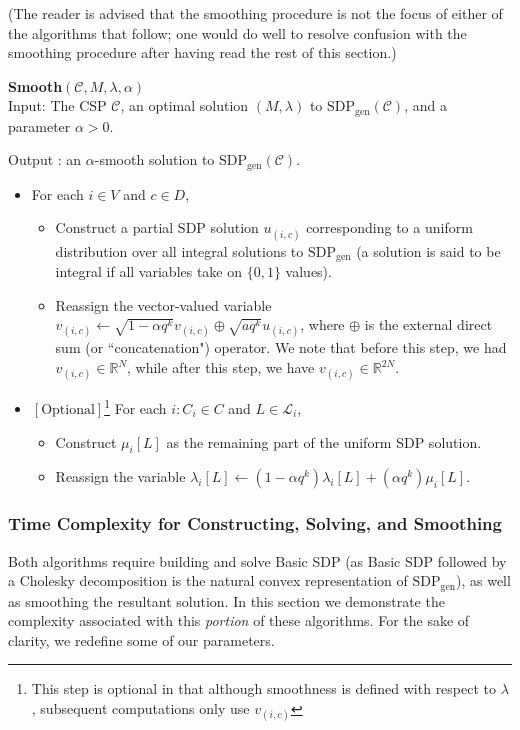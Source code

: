 \documentclass[letterpaper, 12pt]{article}
\numberwithin{equation}{section}
\begin{document}
 (The reader is advised that the smoothing procedure is not the focus of either of the algorithms that follow; one would do well to resolve confusion with the smoothing procedure after having read the rest of this section.)

\begin{algorithm}\textbf{Smooth$(\mathcal{C},M,\lambda, \alpha)$} \\

Input: The CSP $\mathcal{C}$, an optimal solution $(M,\lambda)$ to $\text{SDP}_{\text{gen}}(\mathcal{C})$, and a parameter $\alpha > 0$. 

Output : an $\alpha$-smooth solution to $\text{SDP}_{\text{gen}}(\mathcal{C})$.
\begin{itemize}
\item For each $i \in V$ and $c \in D$,
	\begin{itemize}
	\item Construct a partial SDP solution $u_{(i,c)}$ corresponding to a uniform distribution over all integral
	 solutions to
	$\text{SDP}_{\text{gen}}$ (a solution is said to be integral if all variables take on $\{0,1\}$ values).
	\item Reassign the vector-valued variable $v_{(i,c)} \leftarrow \sqrt{1-\alpha q^k} v_{(i,c)} \oplus \sqrt{aq^k}
	u_{(i,c)}$, where $\oplus$ is the external direct sum (or ``concatenation") operator. We note that before this step, we had	
	$v_{(i,c)} \in \mathbb{R}^N$, while after this step, we have $v_{(i,c)} \in \mathbb{R}^{2N}$.
	\end{itemize}
\item $\left[\text{Optional}\right]$\footnote{This step is optional in that although smoothness is defined with respect to $\lambda$, subsequent computations only use $v_{(i,c)}$} For each $i : C_i \in C$ and $L \in \mathcal{L}_i$,
	\begin{itemize}
	\item  Construct $\mu_i[L]$ as the remaining part of the uniform SDP solution.
	\item Reassign the variable $\lambda_i[L] \leftarrow (1-\alpha q^k)\lambda_{i}[L] + (\alpha q^k)\mu_i[L]$. 
	\end{itemize}
\end{itemize}
\end{algorithm}

\subsubsection{Time Complexity for Constructing, Solving, and Smoothing}\label{subsec:buildSolveSmooth}
Both algorithms require building and solve Basic SDP (as Basic SDP followed by a Cholesky decomposition is the natural convex representation of $\text{SDP}_{\text{gen}}$), as well as smoothing the resultant solution. In this section we demonstrate the complexity associated with this \textit{portion} of these algorithms. For the sake of clarity, we redefine some of our parameters.
\end{document}
